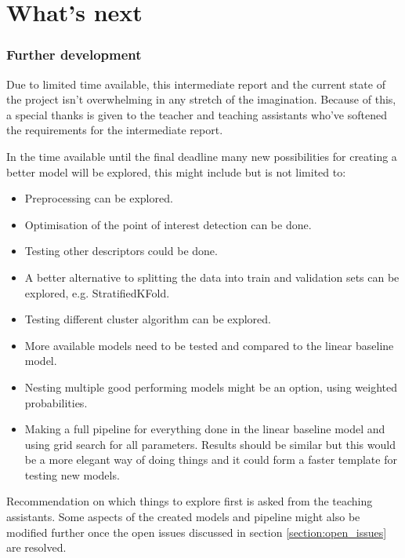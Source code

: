 \part{What's next}
\label{part:whats_next}


\section{Further development}
\label{section:further_development}

Due to limited time available, this intermediate report and the current state of the project isn't overwhelming in any stretch of the imagination.
Because of this, a special thanks is given to the teacher and teaching assistants who've softened the requirements for the intermediate report.

In the time available until the final deadline many new possibilities for creating a better model will be explored, this might include but is not limited to:
\begin{itemize}
    \item Preprocessing can be explored.
    \item Optimisation of the point of interest detection can be done.
    \item Testing other descriptors could be done.
    \item A better alternative to splitting the data into train and validation sets can be explored, e.g. StratifiedKFold.
    \item Testing different cluster algorithm can be explored.
    \item More available models need to be tested and compared to the linear baseline model.
    \item Nesting multiple good performing models might be an option, using weighted probabilities.
    \item Making a full pipeline for everything done in the linear baseline model and using grid search for all parameters. Results should be similar but this would be a more elegant way of doing things and it could form a faster template for testing new models.
\end{itemize}

Recommendation on which things to explore first is asked from the teaching assistants. Some aspects of the created models and pipeline might also be modified further once the open issues discussed in section \ref{section:open_issues} are resolved.

